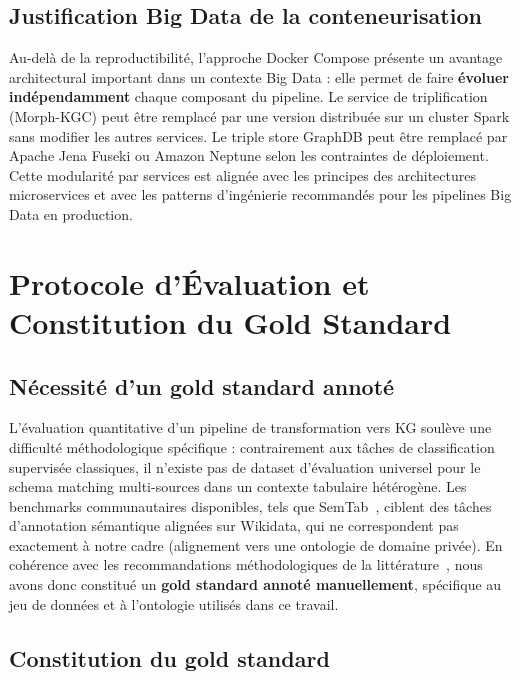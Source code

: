 \subsection{Justification Big Data de la conteneurisation}

Au-delà de la reproductibilité, l'approche Docker Compose présente un avantage
architectural important dans un contexte Big Data : elle permet de faire
\textbf{évoluer indépendamment} chaque composant du pipeline.
Le service de triplification (Morph-KGC) peut être remplacé par une version
distribuée sur un cluster Spark sans modifier les autres services.
Le triple store GraphDB peut être remplacé par Apache Jena Fuseki ou
Amazon Neptune selon les contraintes de déploiement.
Cette modularité par services est alignée avec les principes des architectures
microservices et avec les patterns d'ingénierie recommandés pour les pipelines
Big Data en production.

\section{Protocole d'Évaluation et Constitution du Gold Standard}
\label{sec:protocole_eval}

\subsection{Nécessité d'un gold standard annoté}

L'évaluation quantitative d'un pipeline de transformation vers KG
soulève une difficulté méthodologique spécifique : contrairement
aux tâches de classification supervisée classiques, il n'existe pas
de dataset d'évaluation universel pour le schema matching
multi-sources dans un contexte tabulaire hétérogène.
Les benchmarks communautaires disponibles, tels que
SemTab~\cite{semtab2024, semtab2023}, ciblent des tâches
d'annotation sémantique alignées sur Wikidata, qui ne correspondent
pas exactement à notre cadre (alignement vers une ontologie de domaine
privée).
En cohérence avec les recommandations méthodologiques de la
littérature~\cite{wu2023comprehensive}, nous avons donc constitué
un \textbf{gold standard annoté manuellement}, spécifique au
jeu de données et à l'ontologie utilisés dans ce travail.

\subsection{Constitution du gold standard}

